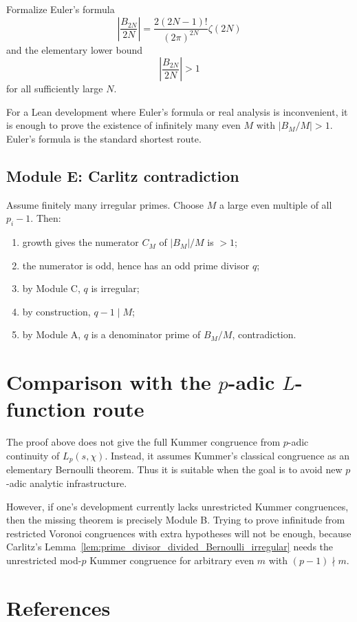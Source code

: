\documentclass[11pt]{article}
\begin{document}
Formalize Euler's formula
\[
  \left|\frac{B_{2N}}{2N}\right|
  =\frac{2(2N-1)!}{(2\pi)^{2N}}\zeta(2N)
\]
and the elementary lower bound
\[
  \left|\frac{B_{2N}}{2N}\right|>1
\]
for all sufficiently large $N$.

For a Lean development where Euler's formula or real analysis is inconvenient, it is enough to prove the existence of infinitely many even $M$ with $|B_M/M|>1$.  Euler's formula is the standard shortest route.

\subsection*{Module E: Carlitz contradiction}

Assume finitely many irregular primes.  Choose $M$ a large even multiple of all $p_i-1$.  Then:
\begin{enumerate}[label=(E\arabic*)]
  \item growth gives the numerator $C_M$ of $|B_M|/M$ is $>1$;
  \item the numerator is odd, hence has an odd prime divisor $q$;
  \item by Module C, $q$ is irregular;
  \item by construction, $q-1\mid M$;
  \item by Module A, $q$ is a denominator prime of $B_M/M$, contradiction.
\end{enumerate}

\section{Comparison with the $p$-adic $L$-function route}

The proof above does not give the full Kummer congruence from $p$-adic continuity of $L_p(s,\chi)$.  Instead, it assumes Kummer's classical congruence as an elementary Bernoulli theorem.  Thus it is suitable when the goal is to avoid new $p$-adic analytic infrastructure.

However, if one's development currently lacks unrestricted Kummer congruences, then the missing theorem is precisely Module B.  Trying to prove infinitude from restricted Voronoi congruences with extra hypotheses will not be enough, because Carlitz's Lemma~\ref{lem:prime_divisor_divided_Bernoulli_irregular} needs the unrestricted mod-$p$ Kummer congruence for arbitrary even $m$ with $(p-1)\nmid m$.

\section{References}
\end{document}
